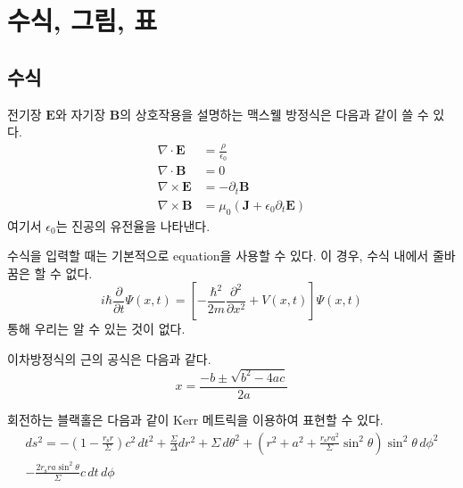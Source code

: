 \section{수식, 그림, 표}

\subsection{수식}

전기장 $\mathbf{E}$와 자기장 $\mathbf{B}$의 상호작용을 설명하는 맥스웰 방정식은 다음과 같이 쓸 수 있다.
\begin{align}
    \nabla \cdot \mathbf{E} &= \frac{\rho}{\epsilon_0}\\
    \nabla \cdot \mathbf{B} &= 0\\
    \nabla \times \mathbf{E} &= -\partial_t \mathbf{B}\\
    \nabla \times \mathbf{B} &= \mu_0 (\mathbf{J} + \epsilon_0 \partial_t \mathbf{E})
\end{align}
여기서 $\epsilon_0$는 진공의 유전율을 나타낸다.

수식을 입력할 때는 기본적으로 equation을 사용할 수 있다. 이 경우, 수식 내에서 줄바꿈은 할 수 없다.
\begin{equation}
i\hbar \frac{\partial}{\partial t} \Psi(x,t) = \left[ -\frac{\hbar^2}{2m} \frac{\partial^2}{\partial x^2} + V(x,t) \right] \Psi(x,t) \label{eq:schrodinger}
\end{equation}
\을 통해 우리는 알 수 있는 것이 없다.

이차방정식의 근의 공식은 다음과 같다.
\begin{equation}
    x = \frac{-b \pm \sqrt{b^2 - 4ac}}{2a}
\end{equation}

회전하는 블랙홀은 다음과 같이 Kerr 메트릭을 이용하여 표현할 수 있다.
\begin{multline}
    ds^2 = -\left( 1 - \frac{r_\text{s} r}{\Sigma} \right) c^2 \, dt^2 + \frac{\Sigma}{\Delta} dr^2 + \Sigma \, d\theta^2 + \left( r^2+ a^2 + \frac{r_\text{s} r a^2}{\Sigma} \sin^2 \theta \right) \sin^2 \theta \, d\phi^2\\ - \frac{2r_\text{s} ra \sin^2 \theta}{\Sigma} c \, dt \, d\phi
\end{multline}

